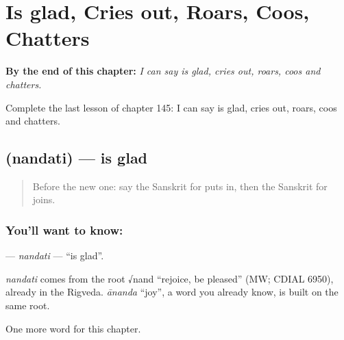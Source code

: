 
\chapter{Is glad, Cries out, Roars, Coos, Chatters}
\label{ch:sa-is-glad-cries-out-roars-coos-chatters}

\begin{chapteropening}
\textbf{By the end of this chapter:} \emph{I can say is glad, cries out, roars, coos and chatters.}

Complete the last lesson of chapter 145: I can say is glad, cries out, roars, coos and chatters.
\end{chapteropening}

\section[\texorpdfstring{\sk{नन्दति} (nandati)}{नन्दति (nandati)}]{ (nandati) — is glad}

\label{lesson:SA-C145-nandati}



\begin{quote}
Before the new one: say the Sanskrit for puts in, then the Sanskrit for joins.
\end{quote}

\subsection*{You'll want to know: }
\textbf{} — \emph{nandati} — \textquotedblleft{}is glad\textquotedblright{}.

\begin{cousinweb}
\emph{nandati} comes from the root √nand \textquotedblleft{}rejoice, be pleased\textquotedblright{} (MW; CDIAL 6950), already in the Rigveda. \emph{ānanda} \textquotedblleft{}joy\textquotedblright{}, a word you already know, is built on the same root.
\end{cousinweb}

\begin{grammarlens}[title={What you've built}]
One more word for this chapter.
\end{grammarlens}

